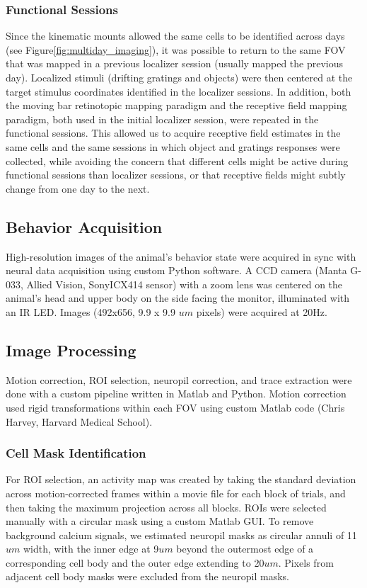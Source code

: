 \subsubsection{Functional Sessions}
Since the kinematic mounts allowed the same cells to be identified across days (see Figure\ref{fig:multiday_imaging}), it was possible to return to the same FOV that was mapped in a previous localizer session (usually mapped the previous day). Localized stimuli (drifting gratings and objects) were then centered at the target stimulus coordinates identified in the localizer sessions. In addition, both the moving bar retinotopic mapping paradigm and the receptive field mapping paradigm, both used in the initial localizer session, were repeated in the functional sessions. This allowed us to acquire receptive field estimates in the same cells and the same sessions in which object and gratings responses were collected, while avoiding the concern that different cells might be active during functional sessions than localizer sessions, or that receptive fields might subtly change from one day to the next.

\subsection{Behavior Acquisition}
High-resolution images of the animal's behavior state were acquired in sync with neural data acquisition using custom Python software. A CCD camera (Manta G-033, Allied Vision, SonyICX414 sensor) with a zoom lens was centered on the animal's head and upper body on the side facing the monitor, illuminated with an IR LED. Images (492x656, 9.9 x 9.9 $um$ pixels) were acquired at 20Hz.

\subsection{Image Processing}
Motion correction, ROI selection, neuropil correction, and trace extraction were done with a custom pipeline written in Matlab and Python. Motion correction used rigid transformations within each FOV using custom Matlab code (Chris Harvey, Harvard Medical School). 

\subsubsection{Cell Mask Identification}
For ROI selection, an activity map was created by taking the standard deviation across motion-corrected frames within a movie file for each block of trials, and then taking the maximum projection across all blocks. ROIs were selected manually with a circular mask using a custom Matlab GUI. To remove background calcium signals, we estimated neuropil masks as circular annuli of 11$um$ width, with the inner edge at 9$um$ beyond the outermost edge of a corresponding cell body and the outer edge extending to 20$um$. Pixels from adjacent cell body masks were excluded from the neuropil masks. 
